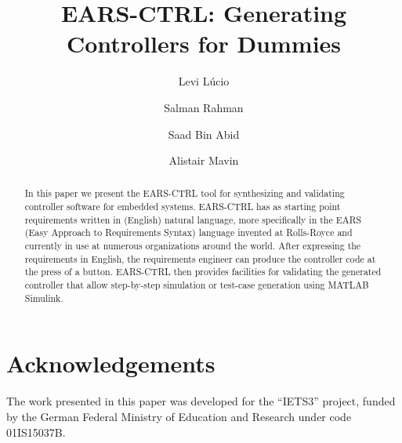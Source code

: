 \documentclass{llncs}
\begin{document}
%
\frontmatter          %

\mainmatter              %
%
\title{EARS-CTRL: Generating Controllers for Dummies}
%
\titlerunning{}  %
%
\author{Levi L\'ucio \and Salman Rahman
 \and Saad Bin Abid \and Alistair Mavin}
%
\authorrunning{} %
%
\tocauthor{}
%

\maketitle              %
\vspace{-.3cm}
\begin{abstract}
In this paper we present the EARS-CTRL tool for synthesizing and validating
controller software for embedded systems. EARS-CTRL has as starting point
requirements written in (English) natural language, more specifically in the
EARS (Easy Approach to Requirements Syntax) language invented at Rolls-Royce and
currently in use at numerous organizations around the world. After expressing
the requirements in English, the requirements engineer can produce the
controller code at the press of a button.
EARS-CTRL then provides facilities for validating the generated controller that
allow step-by-step simulation or test-case generation using MATLAB
Simulink.\vspace{-.5cm}
\end{abstract}

 

 





%

\section*{Acknowledgements}
The work presented in this paper was developed for the ``IETS3'' project, funded
by the German Federal Ministry of Education and Research under code
01IS15037B.\vspace{-.3cm}



\end{document}
